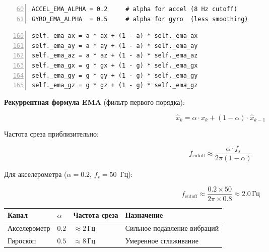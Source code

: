 \begin{filebox}[title={\filepath{imu\_node.py}, строки 60--64, 151--167 --- \_apply\_ema()}]
\begin{lstlisting}[style=pythonstyle, numbers=left, firstnumber=60]
ACCEL_EMA_ALPHA = 0.2     # alpha for accel (8 Hz cutoff)
GYRO_EMA_ALPHA  = 0.5     # alpha for gyro  (less smoothing)
\end{lstlisting}
\begin{lstlisting}[style=pythonstyle, numbers=left, firstnumber=160]
self._ema_ax = a * ax + (1 - a) * self._ema_ax
self._ema_ay = a * ay + (1 - a) * self._ema_ay
self._ema_az = a * az + (1 - a) * self._ema_az
self._ema_gx = g * gx + (1 - g) * self._ema_gx
self._ema_gy = g * gy + (1 - g) * self._ema_gy
self._ema_gz = g * gz + (1 - g) * self._ema_gz
\end{lstlisting}
\end{filebox}

\textbf{Рекуррентная формула EMA} (фильтр первого порядка):

\begin{equation}
  \boxed{\hat{x}_k = \alpha \cdot x_k + (1-\alpha) \cdot \hat{x}_{k-1}}
  \label{eq:ema}
\end{equation}

Частота среза приблизительно:

\begin{equation}
  f_{\text{cutoff}} \approx \frac{\alpha \cdot f_s}{2\pi(1-\alpha)}
  \label{eq:ema_cutoff}
\end{equation}

Для акселерометра ($\alpha = 0.2$, $f_s = 50$~Гц):

\begin{equation}
  f_{\text{cutoff}} \approx \frac{0.2 \times 50}{2\pi \times 0.8} \approx 2.0\,\text{Гц}
  \label{eq:ema_cutoff_accel}
\end{equation}

\begin{center}
\begin{tabular}{llll}
\toprule
\textbf{Канал} & $\alpha$ & \textbf{Частота среза} & \textbf{Назначение}\\
\midrule
Акселерометр & $0.2$ & ${\approx}2\,\text{Гц}$ & Сильное подавление вибраций\\
Гироскоп     & $0.5$ & ${\approx}8\,\text{Гц}$ & Умеренное сглаживание\\
\bottomrule
\end{tabular}
\end{center}


